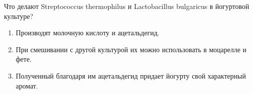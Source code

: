 
Что делают
Streptococcus thermophilus и Lactobacillus bulgaricus в йогуртовой культуре?

\begin{enumerate}
    \item Производят молочную кислоту и ацетальдегид.
    \item При смешивании с другой культурой их можно использовать в моцарелле и фете.
    \item Полученный благодаря им ацетальдегид придает йогурту свой характерный аромат.
\end{enumerate}



